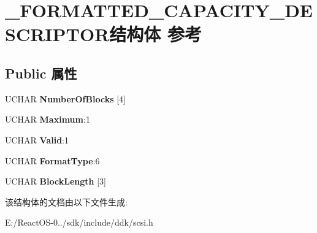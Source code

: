 \hypertarget{struct___f_o_r_m_a_t_t_e_d___c_a_p_a_c_i_t_y___d_e_s_c_r_i_p_t_o_r}{}\section{\+\_\+\+F\+O\+R\+M\+A\+T\+T\+E\+D\+\_\+\+C\+A\+P\+A\+C\+I\+T\+Y\+\_\+\+D\+E\+S\+C\+R\+I\+P\+T\+O\+R结构体 参考}
\label{struct___f_o_r_m_a_t_t_e_d___c_a_p_a_c_i_t_y___d_e_s_c_r_i_p_t_o_r}
\subsection*{Public 属性}
\begin{DoxyCompactItemize}
\item 
\mbox{\label{struct___f_o_r_m_a_t_t_e_d___c_a_p_a_c_i_t_y___d_e_s_c_r_i_p_t_o_r_ac56527e3b8700104acc3204b0755fef4}} 
U\+C\+H\+AR {\bfseries Number\+Of\+Blocks} \mbox{[}4\mbox{]}
\item 
\mbox{\label{struct___f_o_r_m_a_t_t_e_d___c_a_p_a_c_i_t_y___d_e_s_c_r_i_p_t_o_r_a7e31cbbf667262f54725bd725b236a12}} 
U\+C\+H\+AR {\bfseries Maximum}\+:1
\item 
\mbox{\label{struct___f_o_r_m_a_t_t_e_d___c_a_p_a_c_i_t_y___d_e_s_c_r_i_p_t_o_r_addf92a911bcba3bd02c5c690c2265ba5}} 
U\+C\+H\+AR {\bfseries Valid}\+:1
\item 
\mbox{\label{struct___f_o_r_m_a_t_t_e_d___c_a_p_a_c_i_t_y___d_e_s_c_r_i_p_t_o_r_a1bfac0e2cffe4785fd3fcb9acea1d739}} 
U\+C\+H\+AR {\bfseries Format\+Type}\+:6
\item 
\mbox{\label{struct___f_o_r_m_a_t_t_e_d___c_a_p_a_c_i_t_y___d_e_s_c_r_i_p_t_o_r_afdb2fb7f7bfab57229d282dab1382cbd}} 
U\+C\+H\+AR {\bfseries Block\+Length} \mbox{[}3\mbox{]}
\end{DoxyCompactItemize}


该结构体的文档由以下文件生成\+:\begin{DoxyCompactItemize}
\item 
E\+:/\+React\+O\+S-\/0../sdk/include/ddk/scsi.\+h\end{DoxyCompactItemize}
